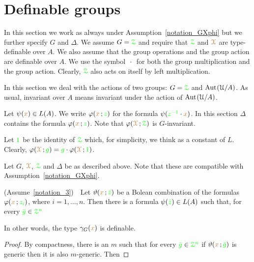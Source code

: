 \section{Definable groups}\label{definablegroups}

In this section we work as always under Assumption~\ref{notation_GXphi} but we further specify $G$ and $\Delta$.
We assume $G={\color{green}\EuScript Z}$ and require that ${\color{green}\EuScript Z}$ and ${\color{brown}\EuScript X}$ are type-definable over $A$.
We also assume that the group operations and the group action are definable over $A$.
We use the symbol $\,\cdot\,$ for both the group multiplication and the group action.
Clearly, ${\color{green}\EuScript Z}$ also acts on itself by left multiplication.

In this section we deal with the actions of two groups: $G={\color{green}\EuScript Z}$ and ${\rm Aut\kern.15ex}(\EuScript U/A)$.
As usual, invariant over $A$ means invariant under the action of ${\rm Aut\kern.15ex}(\EuScript U/A)$.

Let $\psi({\color{brown} x})\in L(A)$.
We write $\varphi({\color{brown} x}\,;{\color{green} z})$ for the formula $\psi({\color{green} z^{-1}}\cdot{\color{brown}x})$.
In this section $\Delta$ contains the formula $\varphi({\color{brown} x}\,;{\color{green} z})$.
Note that $\varphi({\color{brown}\EuScript X}\,;{\color{green}\EuScript Z})$ is $G$-invariant.

Let ${\color{green} 1}$ be the identity of ${\color{green}\EuScript Z}$ which, for simplicity, we think as a constant of $L$.
Clearly, $\varphi({\color{brown}\EuScript X}\,;{\color{green} g})={\color{green} g}\cdot\varphi({\color{brown}\EuScript X}\,;{\color{green} 1})$.

\begin{assumption}\label{notation_3}
  Let $G$, ${\color{brown}\EuScript X}$, ${\color{green}\EuScript Z}$ and $\Delta$ be as described above.
  Note that these are compatible with Assumption~\ref{notation_GXphi}.
\end{assumption}

\begin{fact}
  (Assume~\ref{notation_3})\ \ 
  Let $\vartheta({\color{brown} x}\,;{\color{green}\bar z})$ be a Bolean combination of the formulas $\varphi({\color{brown} x}\,;{\color{green} z_i})$, where $i=1,\dots,n$. 
  Then there is a formula $\psi({\color{green}\bar z})\in L(A)$ such that, for every  ${\color{green}\bar g}\in{\color{green}\EuScript Z^n}$


  In other words, the type $\gamma_G({\color{brown} x})$ is definable.
\end{fact}

\begin{proof}
  By compactness, there is an $m$ such that for every ${\color{green}\bar g}\in{\color{green}\EuScript Z^n}$ if $\vartheta({\color{brown} x}\,;{\color{green}\bar g})$ is generic then it is also $m$-generic.
  Then

\end{proof}

